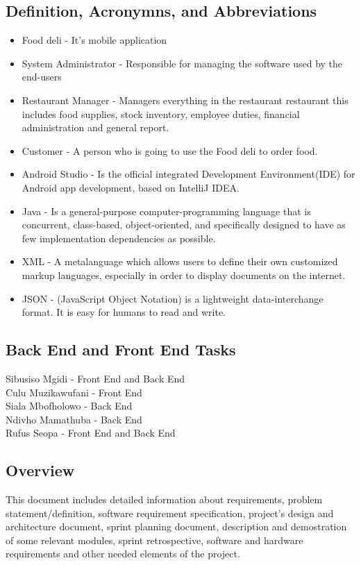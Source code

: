 \documentclass[12pt]{article}
\begin{document}
\subsection{Definition, Acronymns, and Abbreviations}
\begin{itemize}
	\item Food deli - It's mobile application
	\item System Administrator - Responsible for managing the software used by the end-users
	\item Restaurant Manager - Managers everything in the restaurant restaurant this includes food supplies, stock inventory, employee duties, financial administration and general report.
	\item Customer - A person who is going to use the Food deli to order food.
	\item Android Studio - Is the official integrated Development Environment(IDE) for Android app development, based on IntelliJ IDEA.
	\item Java - Is a general-purpose computer-programming language that is concurrent, class-based, object-oriented, and specifically designed to have as few implementation dependencies as possible.
	\item XML - A metalanguage which allows users to define their own customized markup languages, especially in order to display documents on the internet.
	\item JSON - (JavaScript Object Notation) is a lightweight data-interchange format. It is easy for humans to read and write.
\end{itemize}

\subsection{Back End and Front End Tasks}
 Sibusiso Mgidi - Front End and Back End\\
 Culu Muzikawufani - Front End\\
 Siala Mbofholowo - Back End\\
 Ndivho Mamathuba - Back End\\
 Rufus Seopa - Front End and Back End

\subsection{Overview}
This document includes detailed information about requirements, problem statement/definition, software requirement specification, project's design and architecture document, sprint planning document, description and demostration of some relevant modules, sprint retrospective, software and hardware requirements and other needed elements of the project.
\end{document}
